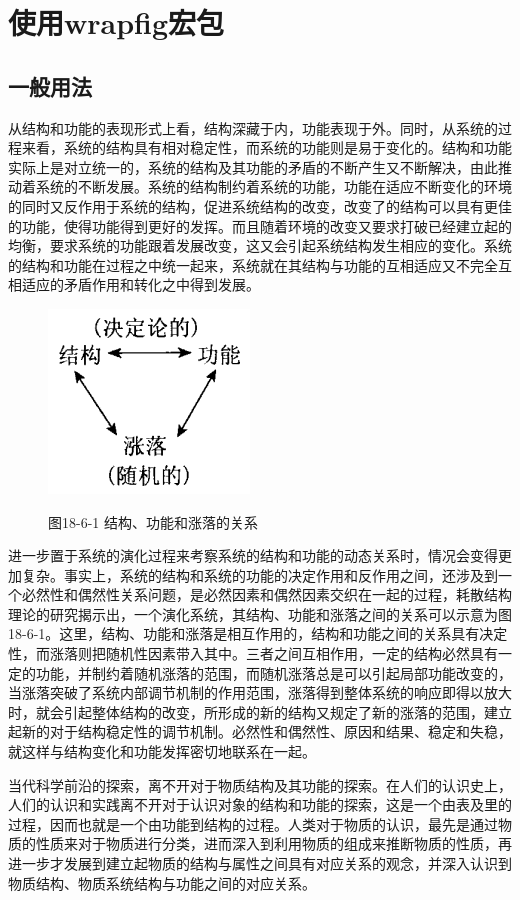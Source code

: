 \documentclass{article}
\begin{document}
\section{使用wrapfig宏包}


\subsection{一般用法}
从结构和功能的表现形式上看，结构深藏于内，功能表现于外。同时，从系统的过程来看，系统的结构具有相对稳定性，而系统的功能则是易于变化的。结构和功能实际上是对立统一的，系统的结构及其功能的矛盾的不断产生又不断解决，由此推动着系统的不断发展。系统的结构制约着系统的功能，功能在适应不断变化的环境的同时又反作用于系统的结构，促进系统结构的改变，改变了的结构可以具有更佳的功能，使得功能得到更好的发挥。而且随着环境的改变又要求打破已经建立起的均衡，要求系统的功能跟着发展改变，这又会引起系统结构发生相应的变化。系统的结构和功能在过程之中统一起来，系统就在其结构与功能的互相适应又不完全互相适应的矛盾作用和转化之中得到发展。

\begin{figure}
  \centering
  \includegraphics[width=.3\textwidth]{figure1.png}

  图18-6-1 结构、功能和涨落的关系
\end{figure}

进一步置于系统的演化过程来考察系统的结构和功能的动态关系时，情况会变得更加复杂。事实上，系统的结构和系统的功能的决定作用和反作用之间，还涉及到一个必然性和偶然性关系问题，是必然因素和偶然因素交织在一起的过程，耗散结构理论的研究揭示出，一个演化系统，其结构、功能和涨落之间的关系可以示意为图18-6-1。这里，结构、功能和涨落是相互作用的，结构和功能之间的关系具有决定性，而涨落则把随机性因素带入其中。三者之间互相作用，一定的结构必然具有一定的功能，并制约着随机涨落的范围，而随机涨落总是可以引起局部功能改变的，当涨落突破了系统内部调节机制的作用范围，涨落得到整体系统的响应即得以放大时，就会引起整体结构的改变，所形成的新的结构又规定了新的涨落的范围，建立起新的对于结构稳定性的调节机制。必然性和偶然性、原因和结果、稳定和失稳，就这样与结构变化和功能发挥密切地联系在一起。

当代科学前沿的探索，离不开对于物质结构及其功能的探索。在人们的认识史上，人们的认识和实践离不开对于认识对象的结构和功能的探索，这是一个由表及里的过程，因而也就是一个由功能到结构的过程。人类对于物质的认识，最先是通过物质的性质来对于物质进行分类，进而深入到利用物质的组成来推断物质的性质，再进一步才发展到建立起物质的结构与属性之间具有对应关系的观念，并深入认识到物质结构、物质系统结构与功能之间的对应关系。
\end{document}
